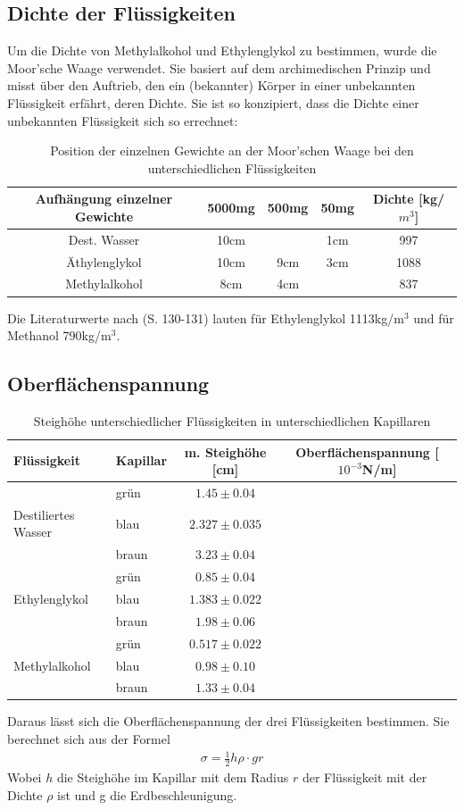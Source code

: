 \documentclass[12pt,a4paper,titlepage,headinclude,bibtotoc]{scrartcl}
\begin{document}
\subsection{Dichte der Flüssigkeiten}
Um die Dichte von Methylalkohol und Ethylenglykol zu bestimmen, wurde die Moor'sche Waage verwendet.
Sie basiert auf dem archimedischen Prinzip und misst über den Auftrieb, den ein (bekannter) Körper in einer unbekannten Flüssigkeit erfährt, deren Dichte.
Sie ist so konzipiert, dass die Dichte einer unbekannten Flüssigkeit sich so errechnet:

\begin{table}
\centering
\begin{tabular}{|c|c|c|c|c|}
\hline Aufhängung einzelner Gewichte & 5000mg & 500mg & 50mg &Dichte [kg/$m^3$]\\
\hline Dest. Wasser  & 10cm	&	& 1cm	& 997	\\
\hline Äthylenglykol & 10cm	& 9cm	& 3cm	& 1088	\\
\hline Methylalkohol & 8cm	& 4cm	& 	& 837	\\\hline
\end{tabular}
\caption{Position der einzelnen Gewichte an der Moor'schen Waage bei den unterschiedlichen Flüssigkeiten\label{tab:dichte}}
\end{table}
Die Literaturwerte nach \cite{Formelsammlung} (S. 130-131) lauten für Ethylenglykol 1113kg/m$^3$ und für Methanol 790kg/m$^3$.
\subsection{Oberflächenspannung}
\begin{table}[!h]
\centering
\begin{tabular}{|l|l|c|c|}
\hline
Flüssigkeit 		&Kapillar & m. Steighöhe [cm]	& Oberflächenspannung [$10^{-3}$N/m]\\\hline\hline
			&grün	& $1.45\pm 0.04$		&\\
Destiliertes Wasser	&blau	& $2.327\pm 0.035$		&\\
                        &braun  & $3.23\pm 0.04$		&\\
\hline
			&grün	& $0.85\pm 0.04$		&\\
Ethylenglykol		&blau	& $1.383\pm 0.022$		&\\
			&braun	& $1.98\pm 0.06$		&\\
\hline
			&grün	& $0.517\pm 0.022$		&\\
Methylalkohol		&blau	& $0.98\pm 0.10$		&\\
			&braun	& $1.33\pm 0.04$		&\\
\hline
\end{tabular}
\caption{Steighöhe unterschiedlicher Flüssigkeiten in unterschiedlichen Kapillaren}
\end{table}
Daraus lässt sich die Oberflächenspannung der drei Flüssigkeiten bestimmen.
Sie berechnet sich aus der Formel
\begin{align}
\sigma=\frac{1}{2}h\rho\cdot g r
\end{align} 
Wobei $h$ die Steighöhe im Kapillar mit dem Radius $r$ der Flüssigkeit mit der Dichte $\rho$ ist und g die Erdbeschleunigung.
\end{document}
